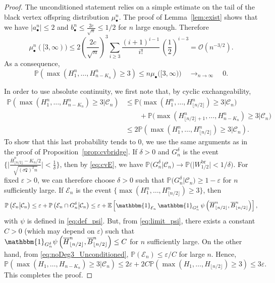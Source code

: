 \documentclass[AHL,XML,longabstracts,Unicode]{cedram}
\def\eps{\varepsilon}
\def\EEE{\mathcal E}
\def\mub{\mu_{\bullet}}
\def\mubn{\mu_{\bullet}^{n}}
\def\sbn{\sigma_{\bullet}^{n}}
\def\oB{\overline{B}}
\def\oH{\overline{H}}
\renewcommand{\epsilon}{\varepsilon}
\newcommand\Es[1]{\mathbb{E}\left[#1\right]}
\renewcommand\Pr[1]{\mathbb{P}\left(#1\right)}
\newcommand\Prb[1]{\mathbb{P}\big(#1\big)}
\begin{document}
\begin{proof}
The unconditioned statement relies on a simple estimate on the tail of the black vertex offspring distribution $\mubn$.
 The proof of Lemma~\ref{lem:exist} shows that we have $|a_\bullet^n| \le 2$ and $b_\bullet^n \le \tfrac{2 c}{\sqrt{n}} \le 1/2$ for $n$ large enough. Therefore
  \begin{equation}
    \mubn([3,\infty))\le 2 \left(\frac{2 c}{\sqrt{n}} \right)^3  \sum_{i \ge 3} \frac{(i+1)^{i-1}}{i!} \, \left(\frac{1}{2}\right)^{i-3}=\mathcal O(n^{-3/2}).
    \label{eq:tail_mub}
  \end{equation}
  As a consequence,
  \begin{equation}
    \Pr{\max(H^{n}_{1}, \ldots, H^{n}_{n-K_{n}}) \geq 3} \leq n  \mub\big([3,\infty)\big)  \quad \mathop{\longrightarrow}_{n \rightarrow \infty} \quad 0.
    \label{eq:noDeg3_Unconditioned}
  \end{equation}


  In order to use absolute continuity,
  we first note that, by cyclic exchangeability,
  \begin{align*}
    \Pr{\max(H^{n}_{1}, \ldots, H^{n}_{n-K_{n}})  \geq 3 \big| \mathcal{C}_{n} } &\leq
\Prb{\max(H^{n}_{1}, \ldots, H^{n}_{\lfloor n/2 \rfloor})  \geq 3 \big| \mathcal{C}_{n} }\\
&\qquad + \Prb{\max(H^{n}_{\lfloor n/2 \rfloor+1}, \ldots, H^{n}_{n-K_{n}})  \geq 3 \big| \mathcal{C}_{n} }\\
&\le 2\Pr{\max(H^{n}_{1}, \ldots, H^{n}_{\lfloor n/2 \rfloor})  \geq 3 \big| \mathcal{C}_{n} }.
\end{align*}
To show that this last probability tends to $0$,
we use the same arguments as in the proof  of Proposition~\ref{prop:cvbridge}.
If $\delta >0$ and $G^{\delta}_{n}$  is the event $  \big\{\big| \tfrac{\oH^{n}_{ \lfloor  n /2 \rfloor } -  K_{n}/2 }{\sqrt{ (\sbn)^{2} n} } \big| < \tfrac{1}{\delta} \big\}$, then by \eqref{eq:cvE},
we have $\Prb{G^{\delta}_{n} | \mathcal{C}_{n}  } \rightarrow \Prb{|W^{\mathrm{br}}_{1/2}| <1/\delta}$.
For fixed $\epsilon>0$, we can therefore choose $\delta>0$ such that $\Prb{G^{\delta}_{n} \big| \mathcal{C}_{n} } \geq 1- \epsilon$ for $n$ sufficiently large. If $ \EEE_{n}$ is the event $\{\max(H^{n}_{1}, \ldots, H^{n}_{\lfloor n/2 \rfloor})  \geq 3\}$,  then
\[\Pr{ \EEE_{n} \big | \mathcal{C}_{n}  } \le \epsilon + \Pr{ \EEE_{n} \cap G^\delta_n \big| \mathcal{C}_{n} }
\leq \epsilon+ \Es{ \mathbbm{1}_{\EEE_n}\, \mathbbm{1}_{G^\delta_n} \,  \psi \left( \oH^{n}_{ \lfloor n/2 \rfloor },\oB^{n}_{ \lfloor    n/2 \rfloor } \right)},\]
with $\psi$ is defined in \eqref{eq:def_psi}.
But, from \eqref{eq:limit_psi}, there exists a constant $C>0$ (which may depend on $\epsilon$) such that
$\mathbbm{1}_{G^\delta_n} \psi \left( \oH^{n}_{ \lfloor n/2 \rfloor },\oB^{n}_{ \lfloor    n/2 \rfloor } \right) \leq C$ for $n$ sufficiently large.
On the other hand, from \eqref{eq:noDeg3_Unconditioned},
$\mathbb{P}(\EEE_n) \le \eps/C$ for large $n$.
Hence,
\[\Pr{\max(H_{1}, \ldots, H_{n-K_{n}})  \geq 3 \big| \mathcal{C}_{n} } \leq  2\epsilon + 2C \Pr{\max(H_{1}, \ldots, H_{\lfloor n/2 \rfloor}) \geq 3} \leq 3\epsilon.\]
This completes the proof.
\end{proof}
\end{document}
